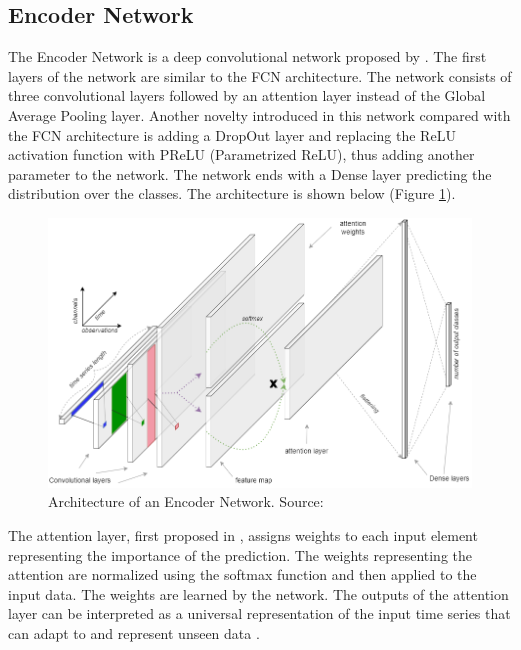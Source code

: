 \documentclass[a4paper,11pt,twoside]{report}
\theoremstyle{definition}
\begin{document}
\FloatBarrier

\subsection{Encoder Network}
 The Encoder Network is a deep convolutional network proposed by \cite{encoder}. The first layers of the network are similar to the FCN architecture. The network consists of three convolutional layers followed by an attention layer instead of the Global Average Pooling layer. Another novelty introduced in this network compared with the FCN architecture is adding a DropOut layer and replacing the ReLU activation function with PReLU (Parametrized ReLU), thus adding another parameter to the network. The network ends with a Dense layer predicting the distribution over the classes. The architecture is shown below (Figure \ref{fig:encoder_img}).

\FloatBarrier

\begin{figure}[h!]
\centering
\includegraphics[width=15.5cm]{imgs/encoder.png}
\caption{Architecture of an Encoder Network. Source: \cite{dl_tsc}}
\label{fig:encoder_img}
\end{figure}

\FloatBarrier

The attention layer, first proposed in \cite{attention}, assigns weights to each input element representing the importance of the prediction. The weights representing the attention are normalized using the softmax function and then applied to the input data. The weights  are learned by the network. The outputs of the attention layer can be interpreted as a universal representation of the input time series that can adapt to and represent unseen data \cite{encoder}.
\end{document}
